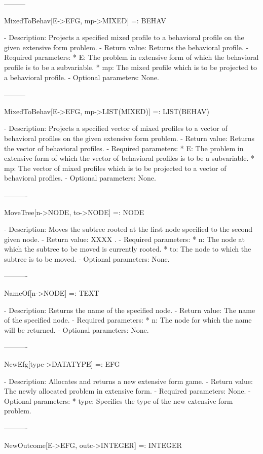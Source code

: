 ---------

MixedToBehav[E->EFG, mp->MIXED] =: BEHAV

   -	Description:  Projects a specified mixed profile to a behavioral 
	profile on the given extensive form problem.
   -	Return value:  Returns the behavioral profile.
   -	Required parameters:
	  *  E:  The problem in extensive form of which the behavioral profile
		is to be a subvariable.
	  *  mp:  The mixed profile which is to be projected to a behavioral
		profile.
   -	Optional parameters:  None.

---------

MixedToBehav[E->EFG, mp->LIST(MIXED)] =: LIST(BEHAV)

   -	Description:  Projects a specified vector of mixed profiles to a vector
	of behavioral profiles on the given extensive form problem.
   -	Return value:  Returns the vector of behavioral profiles.
   -	Required parameters:
	  *  E:  The problem in extensive form of which the vector of 
		behavioral profiles is to be a subvariable.
	  *  mp:  The vector of mixed profiles which is to be projected to a 
		vector of behavioral profiles.
   -	Optional parameters:  None.

----------

MoveTree[n->NODE, to->NODE] =: NODE

   -	Description:  Moves the subtree rooted at the first node specified to
	the second given node.
   -	Return value:  XXXX .
   -	Required parameters:
	  *  n:  The node at which the subtree to be moved is currently rooted.
	  *  to:  The node to which the subtree is to be moved.
   -	Optional parameters:  None.

----------

NameOf[n->NODE] =: TEXT

   -	Description:  Returns the name of the specified node.
   -	Return value:  The name of the specified node.
   -	Required parameters:
	   *  n:  The node for which the name will be returned.
   -	Optional parameters:  None.

----------

NewEfg[{type->DATATYPE}] =: EFG

   -	Description:  Allocates and returns a new extensive form game.
   -	Return value:  The newly allocated problem in extensive form.
   -	Required parameters:  None.
   -	Optional parameters: 
	  *  type:  Specifies the type of the new extensive form problem.

----------

NewOutcome[E->EFG, {outc->INTEGER}] =: INTEGER

